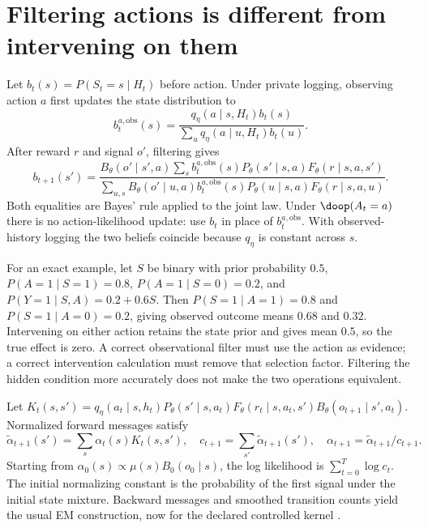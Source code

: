 \section{Filtering actions is different from intervening on them}
\label{r3:filtering}
Let $b_t(s)=P(S_t=s\mid H_t)$ before action. Under private logging,
observing action $a$ first updates the state distribution to
\begin{equation}
 b_t^{a,\mathrm{obs}}(s)
   =\frac{q_\eta(a\mid s,H_t)b_t(s)}
          {\sum_u q_\eta(a\mid u,H_t)b_t(u)}.
 \label{r3:action-update}
\end{equation}
After reward $r$ and signal $o'$, filtering gives
\begin{equation}
 b_{t+1}(s')=
 \frac{B_\theta(o'\mid s',a)
       \sum_s b_t^{a,\mathrm{obs}}(s)P_\theta(s'\mid s,a)
                                    F_\theta(r\mid s,a,s')}
      {\sum_{u,s}B_\theta(o'\mid u,a)b_t^{a,\mathrm{obs}}(s)
            P_\theta(u\mid s,a)F_\theta(r\mid s,a,u)}.
 \label{r3:controlled-filter}
\end{equation}
Both equalities are Bayes' rule applied to the joint law. Under
$\doop(A_t=a)$ there is no action-likelihood update: use $b_t$ in
place of $b_t^{a,\mathrm{obs}}$. With observed-history logging the two
beliefs coincide because $q_\eta$ is constant across $s$.

For an exact example, let $S$ be binary with prior probability $0.5$,
$P(A=1\mid S=1)=0.8$, $P(A=1\mid S=0)=0.2$, and
$P(Y=1\mid S,A)=0.2+0.6S$. Then $P(S=1\mid A=1)=0.8$ and
$P(S=1\mid A=0)=0.2$, giving observed outcome means $0.68$ and
$0.32$. Intervening on either action retains the state prior and gives
mean $0.5$, so the true effect is zero. A correct observational filter
must use the action as evidence; a correct intervention calculation
must remove that selection factor. Filtering the hidden condition more
accurately does not make the two operations equivalent.

Let
$K_t(s,s')=q_\eta(a_t\mid s,h_t)P_\theta(s'\mid s,a_t)
F_\theta(r_t\mid s,a_t,s')B_\theta(o_{t+1}\mid s',a_t)$.
Normalized forward messages satisfy
\[
 \widetilde\alpha_{t+1}(s')=\sum_s\alpha_t(s)K_t(s,s'),\quad
 c_{t+1}=\sum_{s'}\widetilde\alpha_{t+1}(s'),\quad
 \alpha_{t+1}=\widetilde\alpha_{t+1}/c_{t+1}.
\]
Starting from $\alpha_0(s)\propto\mu(s)B_0(o_0\mid s)$, the
log likelihood is $\sum_{t=0}^T\log c_t$. The initial normalizing
constant is the probability of the first signal under the initial state
mixture. Backward messages and smoothed transition counts yield the usual
EM construction, now for the declared controlled kernel \citep{rabiner1989}.

